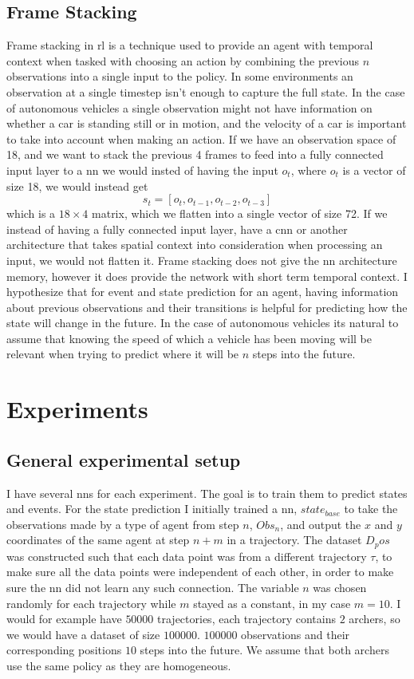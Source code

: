 \documentclass[UKenglish]{uiomasterthesis}
\begin{document}
\section{Frame Stacking}
Frame stacking in \ac{rl} is a technique used to provide an agent with temporal context when tasked with choosing an action by combining the previous $n$ observations into a single input to the policy. In some environments an observation at a single timestep isn't enough to capture the full state. In the case of autonomous vehicles a single observation might not have information on whether a car is standing still or in motion, and the velocity of a car is important to take into account when making an action.
If we have an observation space of 18, and we want to stack the previous 4 frames to feed into a fully connected input layer to a \ac{nn} we would insted of having the input $o_t$, where $o_t$ is a vector of size 18, we would instead get $$s_t = [o_t, o_{t-1}, o_{t-2}, o_{t-3}]$$ which is a $18\times4$ matrix, which we flatten into a single vector of size 72. If we instead of having a fully connected input layer, have a \ac{cnn} or another architecture that takes spatial context into consideration when processing an input, we would not flatten it.
Frame stacking does not give the \ac{nn} architecture memory, however it does provide the network with short term temporal context. I hypothesize that for event and state prediction for an agent, having information about previous observations and their transitions is helpful for predicting how the state will change in the future. In the case of autonomous vehicles its natural to assume that knowing the speed of which a vehicle has been moving will be relevant when trying to predict where it will be $n$ steps into the future.

\chapter{Experiments}
\section{General experimental setup}
I have several \acp{nn} for each experiment. The goal is to train them to predict states and events. For the state prediction I initially trained a \ac{nn}, $state_{base}$ to take the observations made by a type of agent from step $n$, $Obs_n$, and output the $x$ and $y$ coordinates of the same agent at step $n+m$ in a trajectory. The dataset $D_pos$ was constructed such that each data point was from a different trajectory $\tau$, to make sure all the data points were independent of each other, in order to make sure the \ac{nn} did not learn any such connection. The variable $n$ was chosen randomly for each trajectory while $m$ stayed as a constant, in my case $m=10$. I would for example have $50000$ trajectories, each trajectory contains $2$ archers, so we would have a dataset of size $100000$. $100000$ observations and their corresponding positions $10$ steps into the future. We assume that both archers use the same policy as they are homogeneous.
\end{document}
